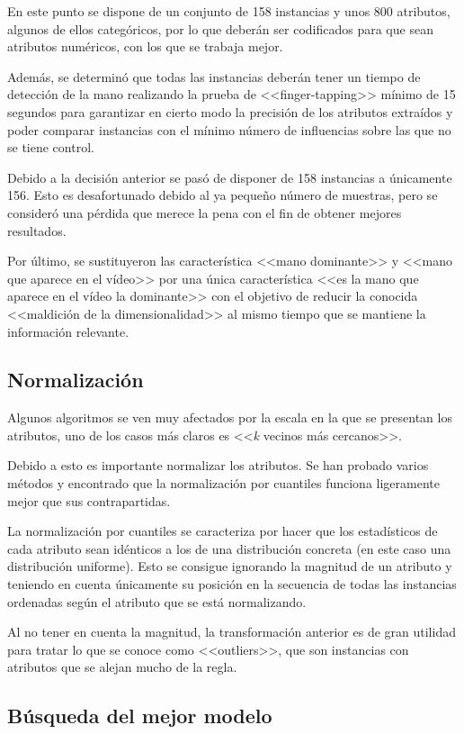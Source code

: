 En este punto se dispone de un conjunto de 158 instancias y unos 800 atributos,
algunos de ellos categóricos, por lo que deberán ser codificados para que sean
atributos numéricos, con los que se trabaja mejor.

Además, se determinó que todas las instancias deberán tener un tiempo de
detección de la mano realizando la prueba de <<finger-tapping>> mínimo de 15
segundos para garantizar en cierto modo la precisión de los atributos extraídos
y poder comparar instancias con el mínimo número de influencias sobre las que no
se tiene control.

Debido a la decisión anterior se pasó de disponer de 158 instancias a únicamente
156. Esto es desafortunado debido al ya pequeño número de muestras, pero se
consideró una pérdida que merece la pena con el fin de obtener mejores
resultados.

Por último, se sustituyeron las característica <<mano dominante>> y <<mano que
aparece en el vídeo>> por una única característica <<es la mano que aparece en
el vídeo la dominante>> con el objetivo de reducir la conocida <<maldición de la
dimensionalidad>> al mismo tiempo que se mantiene la información relevante.

\subsection{Normalización}

Algunos algoritmos se ven muy afectados por la escala en la que se presentan los
atributos, uno de los casos más claros es <<\textit{k} vecinos más cercanos>>.

Debido a esto es importante normalizar los atributos. Se han probado varios
métodos y encontrado que la normalización por cuantiles funciona ligeramente
mejor que sus contrapartidas.

La normalización por cuantiles se caracteriza por hacer que los estadísticos de
cada atributo sean idénticos a los de una distribución concreta (en este caso
una distribución uniforme). Esto se consigue ignorando la magnitud de un
atributo y teniendo en cuenta únicamente su posición en la secuencia de todas
las instancias ordenadas según el atributo que se está normalizando.

Al no tener en cuenta la magnitud, la transformación anterior es de gran
utilidad para tratar lo que se conoce como <<outliers>>, que son instancias con
atributos que se alejan mucho de la regla.

\subsection{Búsqueda del mejor modelo}

